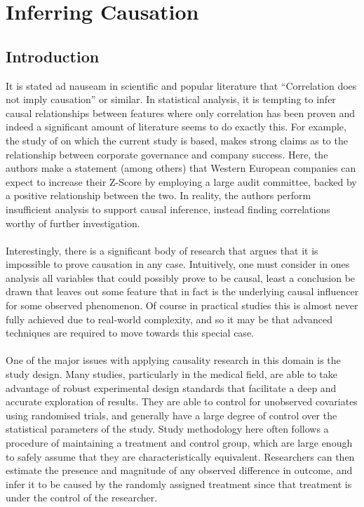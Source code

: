 {\section{Inferring Causation}\label{InferringCausation}
\subsection{Introduction}
{It is stated ad nauseam in scientific and popular literature that ``Correlation does not imply causation'' or similar. In statistical analysis, it is tempting to infer causal relationships between features where only correlation has been proven and indeed a significant amount of literature seems to do exactly this. For example, the study of \cite{moldovan2015learning} on which the current study is based, makes strong claims as to the relationship between corporate governance and company success. Here, the authors make a statement (among others) that Western European companies can expect to increase their Z-Score by employing a large audit committee, backed by a positive relationship between the two. In reality, the authors perform insufficient analysis to support causal inference, instead finding correlations worthy of further investigation. \\\\
Interestingly, there is a significant body of research that argues that it is impossible to prove causation in any case. Intuitively, one must consider in ones analysis all variables that could possibly prove to be causal, least a conclusion be drawn that leaves out some feature that in fact is the underlying causal influencer for some observed phenomenon. Of course in practical studies this is almost never fully achieved due to real-world complexity, and so it may be that advanced techniques are required to move towards this special case.  \\\\
One of the major issues with applying causality research in this domain is the study design. Many studies, particularly in the medical field, are able to take advantage of robust experimental design standards that facilitate a deep and accurate exploration of results. They are able to control for unobserved covariates using randomised trials, and generally have a large degree of control over the statistical parameters of the study. Study methodology here often follows a procedure of maintaining a treatment and control group, which are large enough to safely assume that they are characteristically equivalent. Researchers can then estimate the presence and magnitude of any observed difference in outcome, and infer it to be caused by the randomly assigned treatment since that treatment is under the control of the researcher.  \\\\
}}
